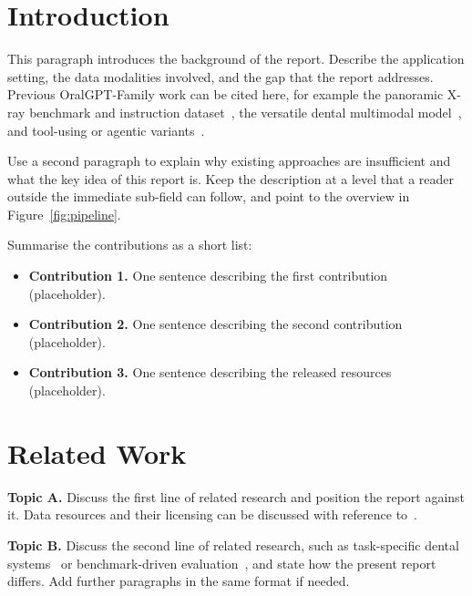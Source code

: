 
\section{Introduction}

This paragraph introduces the background of the report. Describe the
application setting, the data modalities involved, and the gap that the
report addresses. Previous OralGPT-Family work can be cited here, for example
the panoramic X-ray benchmark and instruction dataset~\citep{hao2025mmoral},
the versatile dental multimodal model~\citep{hao2025oralgpt-omni}, and
tool-using or agentic variants~\citep{fan2026oralgpt-plus, hao2026oralagent}.

Use a second paragraph to explain why existing approaches are insufficient
and what the key idea of this report is. Keep the description at a level
that a reader outside the immediate sub-field can follow, and point to the
overview in Figure~\ref{fig:pipeline}.

Summarise the contributions as a short list:
\begin{itemize}[leftmargin=1.2em,itemsep=2pt,topsep=3pt]
  \item \textbf{Contribution 1.} One sentence describing the first contribution (placeholder).
  \item \textbf{Contribution 2.} One sentence describing the second contribution (placeholder).
  \item \textbf{Contribution 3.} One sentence describing the released resources (placeholder).
\end{itemize}

\section{Related Work}

\textbf{Topic A.} Discuss the first line of related research and position the
report against it. Data resources and their licensing can be discussed with
reference to~\citet{hao2025oraldataset}.

\textbf{Topic B.} Discuss the second line of related research, such as
task-specific dental systems~\citep{hao2026plaquesam} or benchmark-driven
evaluation~\citep{hao2025mmoral}, and state how the present report differs.
Add further paragraphs in the same format if needed.

